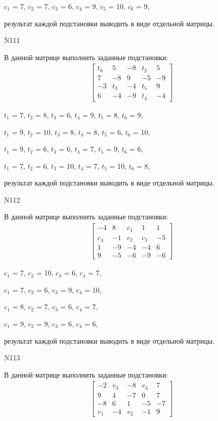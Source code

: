 \documentclass[11pt]{report}
\begin{document}
$c_{1}$ = 7, $c_{2}$ = 7, $c_{3}$ = 6, $c_{4}$ = 9, $c_{5}$ = 10, $c_{6}$ = 9, 

результат каждой подстановки выводить в виде отдельной матрицы.

N111

В данной матрице выполнить заданные подстановки:
\begin{align*}
\left[\begin{matrix}t_{6} & 5 & -8 & t_{2} & 5\\7 & -8 & 9 & -5 & -9\\-3 & t_{3} & -4 & t_{5} & 9\\6 & -4 & -9 & t_{4} & -4\end{matrix}\right]
\end{align*}


$t_{1}$ = 7, $t_{2}$ = 8, $t_{3}$ = 6, $t_{4}$ = 9, $t_{5}$ = 8, $t_{6}$ = 9, 

$t_{1}$ = 9, $t_{2}$ = 10, $t_{3}$ = 8, $t_{4}$ = 8, $t_{5}$ = 6, $t_{6}$ = 10, 

$t_{1}$ = 9, $t_{2}$ = 6, $t_{3}$ = 6, $t_{4}$ = 7, $t_{5}$ = 9, $t_{6}$ = 6, 

$t_{1}$ = 7, $t_{2}$ = 6, $t_{3}$ = 10, $t_{4}$ = 7, $t_{5}$ = 10, $t_{6}$ = 8, 

результат каждой подстановки выводить в виде отдельной матрицы.

N112

В данной матрице выполнить заданные подстановки:
\begin{align*}
\left[\begin{matrix}-4 & 8 & c_{1} & 1 & 1\\c_{4} & -1 & c_{2} & c_{3} & -5\\1 & -9 & -4 & -4 & 6\\9 & -5 & -6 & -9 & -6\end{matrix}\right]
\end{align*}


$c_{1}$ = 7, $c_{2}$ = 10, $c_{3}$ = 6, $c_{4}$ = 7, 

$c_{1}$ = 7, $c_{2}$ = 6, $c_{3}$ = 9, $c_{4}$ = 10, 

$c_{1}$ = 8, $c_{2}$ = 7, $c_{3}$ = 6, $c_{4}$ = 7, 

$c_{1}$ = 9, $c_{2}$ = 9, $c_{3}$ = 6, $c_{4}$ = 6, 

результат каждой подстановки выводить в виде отдельной матрицы.

N113

В данной матрице выполнить заданные подстановки:
\begin{align*}
\left[\begin{matrix}-2 & v_{3} & -8 & v_{4} & 7\\9 & 4 & -7 & 0 & 7\\-8 & 6 & 1 & -5 & -7\\v_{1} & -4 & v_{2} & -1 & 9\end{matrix}\right]
\end{align*}
\end{document}
